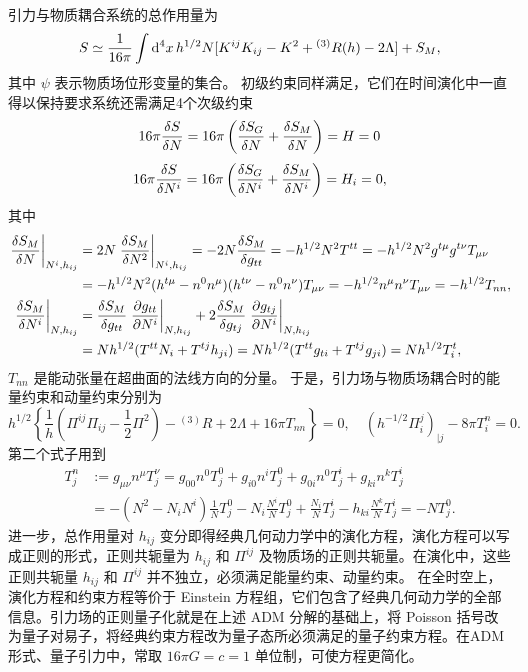引力与物质耦合系统的总作用量为
\[ S \simeq \frac{1}{16\pi }\int \dd[4]{x}h^{1/2}N[K^{ij}K_{ij}-K^{2}+{}^{(3)}R(h)-2\Lambda] + S_{M}, \]
其中 $\psi$ 表示物质场位形变量的集合。 初级约束同样满足，它们在时间演化中一直得以保持要求系统还需满足4个次级约束
\[ 16\pi \fdv{S}{N} = 16\pi \left(\fdv{S_G}{N} + \fdv{S_{M}}{N}\right) = H = 0 \]
\[ 16\pi \fdv{S}{N^{i}} = 16\pi \left(\fdv{S_G}{N^{i}} + \fdv{S_{M}}{N^{i}}\right) = H_{i} = 0, \]
其中
\begin{align*}
    \eval{\fdv{S_{M}}{N}}_{N^{i},h_{ij}} &= 2N\eval{\fdv{S_{M}}{N^{2}}}_{N^{i},h_{ij}} = -2N\fdv{S_{M}}{g_{tt}} = -h^{1/2}N^{2}T^{tt} = -h^{1/2}N^{2}g^{t\mu}g^{t\nu}T_{\mu\nu} \\
    &= -h^{1/2}N^{2}(h^{t\mu}-n^{0}n^{\mu})(h^{t\nu}-n^{0}n^{\nu})T_{\mu\nu} = -h^{1/2}n^{\mu}n^{\nu}T_{\mu\nu} = -h^{1/2}T_{nn}, \\
    \eval{\fdv{S_{M}}{N^{i}}}_{N,h_{ij}} &= \fdv{S_{M}}{g_{tt}}\eval{\pdv{g_{tt}}{N^{i}}}_{N,h_{ij}} + 2\fdv{S_{M}}{g_{tj}}\eval{\pdv{g_{tj}}{N^{i}}}_{N,h_{ij}} \\
    &= Nh^{1/2}(T^{tt}N_{i}+T^{tj}h_{ji}) = Nh^{1/2}(T^{tt}g_{ti}+T^{tj}g_{ji}) = Nh^{1/2}T_{i}^{t}, 
\end{align*}
$T_{nn}$ 是能动张量在超曲面的法线方向的分量。 于是，引力场与物质场耦合时的能量约束和动量约束分别为
\[ h^{1/2}\left\{\frac{1}{h}\left(\Pi^{ij}\Pi_{ij}-\frac{1}{2}\Pi^{2}\right) - {}^{(3)}R + 2\Lambda + 16\pi T_{nn}\right\} = 0,\quad (h^{-1/2}\Pi_{i}^{j})_{|j} - 8\pi T_{i}^{n} = 0. \]
第二个式子用到
\begin{align*}
    T_{j}^{n} &:= g_{\mu\nu}n^{\mu}T_{j}^{\nu} = g_{00}n^{0}T_{j}^{0} + g_{i0}n^{i}T_{j}^{0} + g_{0i}n^{0}T_{j}^{i} + g_{ki}n^{k}T_{j}^{i} \\
    &= -(N^{2}-N_{i}N^{i})\frac{1}{N}T_{j}^{0} - N_{i}\frac{N^{i}}{N}T_{j}^{0} + \frac{N_{i}}{N}T_{j}^{i} - h_{ki}\frac{N^{k}}{N}T_{j}^{i} = -NT_{j}^{0}.
\end{align*}
进一步，总作用量对 $h_{ij}$ 变分即得经典几何动力学中的演化方程，演化方程可以写成正则的形式，正则共轭量为 $h_{ij}$ 和 $\Pi^{ij}$ 及物质场的正则共轭量。在演化中，这些正则共轭量 $h_{ij}$ 和 $\Pi^{ij}$ 并不独立，必须满足能量约束、动量约束。
在全时空上，演化方程和约束方程等价于 Einstein 方程组，它们包含了经典几何动力学的全部信息。引力场的正则量子化就是在上述 ADM 分解的基础上，将 Poisson 括号改为量子对易子，将经典约束方程改为量子态所必须满足的量子约束方程。在ADM形式、量子引力中，常取 $16\pi G=c=1$ 单位制，可使方程更简化。

